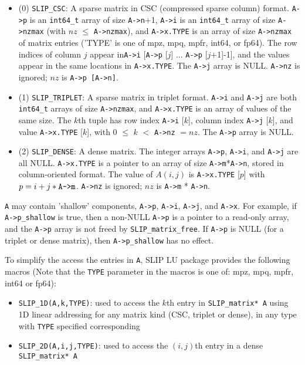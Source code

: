 \documentclass[12pt]{article}
\theoremstyle{definition}
\begin{document}
\begin{itemize}
\item
 (0) \verb|SLIP_CSC|:  A sparse matrix in CSC (compressed sparse column) format.
      \verb|A->p| is an \verb|int64_t| array of size \verb|A->n|+1, \verb|A->i|
      is an \verb|int64_t| array of size \verb|A->nzmax| (with $nz$ $\le$
      \verb|A->nzmax|), and \verb|A->x.TYPE| is an array of size
      \verb|A->nzmax| of matrix entries ('TYPE' is one of mpz, mpq, mpfr,
      int64, or fp64).  The row indices of column $j$ appear in\verb|A->i|
      [\verb|A->p| [$j$] ... \verb|A->p| [$j$+1]-1], and the values appear
      in the same locations in \verb|A->x.TYPE|.  The \verb|A->j| array is
      NULL.  \verb|A->nz| is ignored; $nz$ is \verb|A->p [A->n]|.

\item
 (1) \verb|SLIP_TRIPLET|:  A sparse matrix in triplet format.  \verb|A->i| and
     \verb|A->j| are both \verb|int64_t| arrays of size \verb|A->nzmax|, and
     \verb|A->x.TYPE| is an array of values of the same size.  The $k$th tuple
     has row index \verb|A->i| [$k$], column index \verb|A->j| [$k$], and value
     \verb|A->x.TYPE| [$k$], with 0 $\le$ $k$ $<$ \verb|A->nz| $=nz$. 
     The \verb|A->p| array is NULL.

\item
 (2) \verb|SLIP_DENSE|:  A dense matrix.  The integer arrays \verb|A->p|,
     \verb|A->i|, and \verb|A->j| are all NULL.  \verb|A->x.TYPE| is a pointer
     to an array of size \verb|A->m|*\verb|A->n|, stored in column-oriented
     format.  The value of $A(i,j)$ is \verb|A->x.TYPE| [$p$] with
     $p = i + j*\verb|A->m|$.  \verb|A->nz| is ignored; $nz$ is \verb|A->m| *
     \verb|A->n|.

\end{itemize}

 \verb|A| may contain 'shallow' components, \verb|A->p|,
 \verb|A->i|, \verb|A->j|, and \verb|A->x|.  For example, if
 \verb|A->p_shallow| is true, then a non-NULL \verb|A->p| is a pointer to a
 read-only array, and the \verb|A->p| array is not freed by
 \verb|SLIP_matrix_free|.  If \verb|A->p| is NULL (for a triplet or dense
 matrix), then \verb|A->p_shallow| has no effect.

To simplify the access the entries in \verb|A|, SLIP LU package provides the
following macros (Note that the \verb|TYPE| parameter in the macros is one of:
mpz, mpq, mpfr, int64 or fp64):

\begin{itemize}

\item
\verb|SLIP_1D(A,k,TYPE)|: used to access the $k$th entry in
                         \verb|SLIP_matrix* A| using 1D linear addressing for
                         any matrix kind (CSC, triplet or dense), in any type
                         with \verb|TYPE| specified corresponding

\item
\verb|SLIP_2D(A,i,j,TYPE)|: used to access the $(i,j)$th entry in a dense
                            \verb|SLIP_matrix* A|

\end{itemize}
\end{document}
